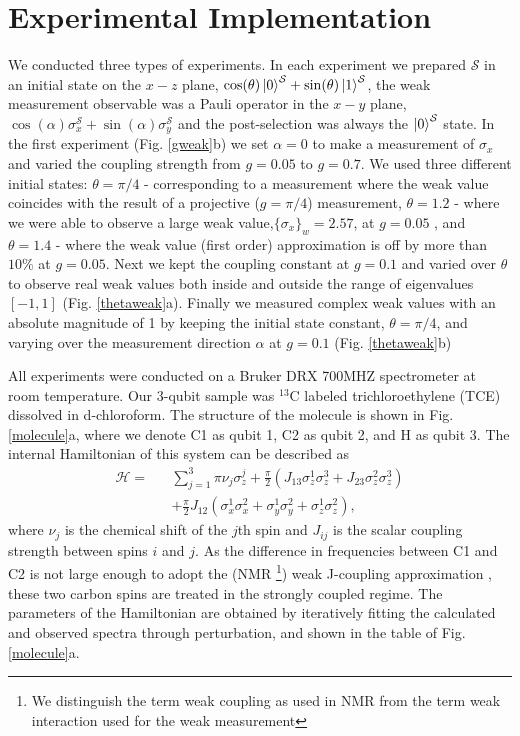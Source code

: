 \documentclass[aps,pra,12pt,onecolumn,showpacs,superscriptaddress,floatfix,footinbib,subfigure]{revtex4}
\def\ket#1{\mathinner{|{#1}\rangle}}
\def\es{{\mathcal{S}}}
\begin{document}
\section{Experimental Implementation}

 We conducted three types of experiments.  In each  experiment we prepared $\es$   in  an initial state on the $x-z$ plane, $\cos(\theta)\ket{0}^\es+\sin(\theta)\ket{1}^\es$, the weak measurement observable was a Pauli operator  in the $x-y$ plane, $\cos(\alpha)\sigma_x^\es+\sin(\alpha)\sigma_y^\es$ and the post-selection was always the $\ket{0}^\es$ state. In the first experiment (Fig. \ref{gweak}b) we set $\alpha=0$ to make a measurement of $\sigma_x$ and varied the coupling strength from $g=0.05$  to $g=0.7$. We used three different initial states: $\theta=\pi/4$ - corresponding to a measurement where the weak value coincides with the result of a projective ($g=\pi/4$) measurement, $\theta=1.2$ -  where we were able to observe a large weak value,$\{\sigma_x\}_w=2.57$, at $g=0.05$ ,  and $\theta=1.4$ - where the weak value (first order) approximation is off by more than $10\%$ at $g=0.05$.  Next we kept the coupling constant at $g=0.1$ and varied over $\theta$  to observe real weak values both inside and outside the range of eigenvalues $[-1,1]$ (Fig. \ref{thetaweak}a). Finally we measured complex weak values with an absolute magnitude of 1 by keeping the initial state constant, $\theta=\pi/4$, and varying over the measurement direction $\alpha$ at $g=0.1$ (Fig. \ref{thetaweak}b)

 All experiments were conducted on a Bruker DRX 700MHZ spectrometer at room temperature. Our 3-qubit sample  was  $^{13}$C labeled trichloroethylene (TCE) dissolved in d-chloroform. The structure of the molecule is shown in Fig. \ref{molecule}a, where we denote C1 as qubit 1, C2 as qubit 2, and H as qubit 3. The internal Hamiltonian of this system can be described as
\begin{eqnarray}\label{Hamiltonian}
\mathcal{H}=&&\sum\limits_{j=1}^3 {\pi \nu _j } \sigma _z^j  + \frac{\pi}{2}(J_{13}\sigma _z^1 \sigma _z^3+J_{23}\sigma _z^2 \sigma _z^3) \nonumber\\
&&+ \frac{\pi}{2}J_{12} (\sigma _x^1 \sigma _x^2+\sigma _y^1 \sigma _y^2+\sigma _z^1 \sigma _z^2),
\end{eqnarray}
where $\nu_j$ is the chemical shift of the $j$th spin and $J_{ij}$ is the scalar coupling strength between spins $i$ and $j$. As the difference in frequencies between C1 and C2 is not large enough to adopt the (NMR \footnote{We distinguish the term weak coupling as used in NMR from the term weak interaction used for the weak measurement}) weak J-coupling  approximation \cite{nmrreview}, these two carbon spins are treated in the strongly coupled regime. The parameters of the Hamiltonian are obtained by iteratively fitting the calculated and observed spectra through perturbation, and shown in the table of Fig. \ref{molecule}a.
\end{document}
